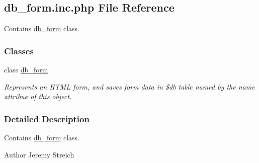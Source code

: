 \hypertarget{db__form_8inc_8php}{\subsection{db\-\_\-form.\-inc.\-php File Reference}
\label{db__form_8inc_8php}
}


Contains \hyperlink{classdb__form}{db\-\_\-form} class.  


\subsubsection*{Classes}
\begin{DoxyCompactItemize}
\item 
class \hyperlink{classdb__form}{db\-\_\-form}
\begin{DoxyCompactList}\small\item\em Represents an H\-T\-M\-L form, and saves form data in \$db table named by the name attribue of this object. \end{DoxyCompactList}\end{DoxyCompactItemize}


\subsubsection{Detailed Description}
Contains \hyperlink{classdb__form}{db\-\_\-form} class. \begin{DoxyAuthor}{Author}
Jeremy Streich 
\end{DoxyAuthor}
